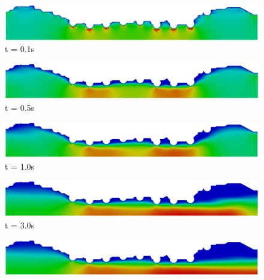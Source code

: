 \vspace{2cm} 
\begin{figure}[H]
     \begin{minipage}{.50\linewidth}
      \centering
      \includegraphics[scale=0.18]{./02_chaps/cap_solution/figure/vel_RealStrut1.png}\\
      t = 0.1s
     \end{minipage}%
     \begin{minipage}{.50\linewidth}
      \centering
      \includegraphics[scale=0.18]{./02_chaps/cap_solution/figure/vel_RealStrut2.png}\\
      t = 0.5s
     \end{minipage}
     \begin{minipage}{.50\linewidth}
     \medskip
      \centering
      \includegraphics[scale=0.18]{./02_chaps/cap_solution/figure/vel_RealStrut3.png}\\
      t = 1.0s
     \end{minipage}%
     \begin{minipage}{.50\linewidth}
     \medskip
      \centering
      \includegraphics[scale=0.18]{./02_chaps/cap_solution/figure/vel_RealStrut4.png}\\
      t = 3.0s
     \end{minipage}
     \begin{minipage}{.50\linewidth}
      \centering
      \includegraphics[scale=0.18]{./02_chaps/cap_solution/figure/vel_RealStrut5.png}\\

\end{minipage}
\end{figure}
